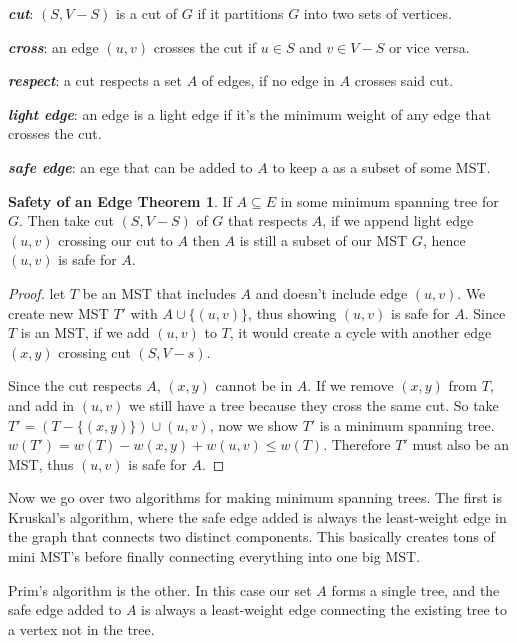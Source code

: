 \documentclass[11pt]{article}
\theoremstyle{definition}
\newtheorem*{safe}{Safety of an Edge Theorem}
\begin{document}
\textbf{\textit{cut}}: \((S,V-S)\) is a cut of \(G\) if it partitions \(G\) into two sets of 
vertices.

\textbf{\textit{cross}}: an edge \((u,v)\) crosses the cut if \(u \in S\) and \(v \in V-S\) or 
vice versa.

\textbf{\textit{respect}}: a cut respects a set \(A\) of edges, if no edge in \(A\) crosses 
said cut.

\textbf{\textit{light edge}}: an edge is a light edge if it's the minimum weight of any edge that 
crosses the cut.

\textbf{\textit{safe edge}}: an ege that can be added to \(A\) to keep a as a subset of some MST.

\begin{safe}
  If \(A \subseteq E\) in some minimum spanning tree for \(G\).  Then take cut \((S, V-S)\) of \(G\) 
  that respects \(A\), if we append light edge \((u,v)\) crossing our cut to \(A\) then \(A\) is 
  still a subset of our MST \(G\), hence \((u,v)\) is safe for \(A\).
\end{safe}

\begin{proof}
  let \(T\) be an MST that includes \(A\) and doesn't include edge \((u,v)\). We create new MST 
  \(T'\) with \(A \cup \{(u,v)\}\), thus showing \((u,v)\) is safe for \(A\).  Since \(T\) is an 
  MST, if we add \((u,v)\) to \(T\), it would create a cycle with another edge \((x,y)\) crossing 
  cut \((S,V-s)\). 

  Since the cut respects \(A\), \((x,y)\) cannot be in \(A\).  If we remove \((x,y)\) from \(T\), 
  and add in \((u,v)\) we still have a tree because they cross the same cut.  So take 
  \(T' = (T-\{(x,y)\})\cup(u,v)\), now we show \(T'\) is a minimum spanning tree. 
  \(w(T') = w(T) - w(x,y) + w(u,v) \leq w(T)\).  Therefore \(T'\) must also be an MST, thus \((u,v)\) 
  is safe for \(A\).
\end{proof}

Now we go over two algorithms for making minimum spanning trees.  The first is Kruskal's algorithm, 
where the safe edge added is always the least-weight edge in the graph that connects two distinct 
components.  This basically creates tons of mini MST's before finally connecting everything into 
one big MST.

Prim's algorithm is the other. In this case our set \(A\) forms a single tree, and the safe edge 
added to \(A\) is always a least-weight edge connecting the existing tree to a vertex not in the 
tree.
\end{document}
